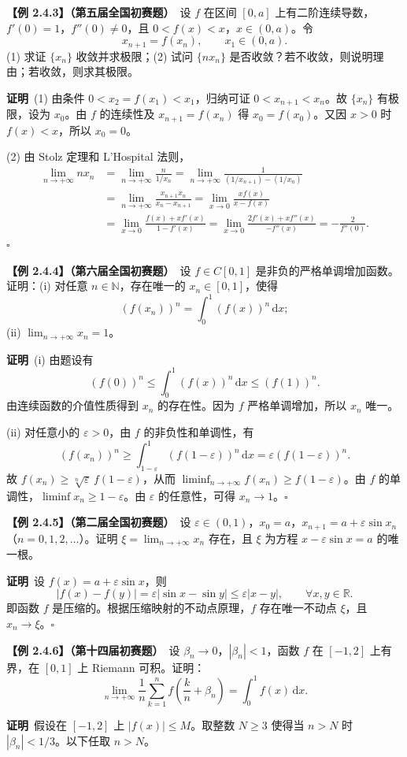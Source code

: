 \documentclass[UTF8,a4paper,11pt]{ctexart}
\newcommand{\ex}[2]{\par\medskip\noindent\textbf{【例 #1】（#2）}\ }
\newcommand{\pf}{\par\noindent\textbf{证明}\ }
\begin{document}
\ex{2.4.3}{第五届全国初赛题}设 $f$ 在区间 $[0,a]$ 上有二阶连续导数，$f'(0)=1$，$f''(0)\ne0$，且 $0<f(x)<x$，$x\in(0,a)$。令
\[
x_{n+1}=f(x_n),\qquad x_1\in(0,a).
\]
(1) 求证 $\{x_n\}$ 收敛并求极限；(2) 试问 $\{nx_n\}$ 是否收敛？若不收敛，则说明理由；若收敛，则求其极限。

\pf (1) 由条件 $0<x_2=f(x_1)<x_1$，归纳可证 $0<x_{n+1}<x_n$。故 $\{x_n\}$ 有极限，设为 $x_0$。由 $f$ 的连续性及 $x_{n+1}=f(x_n)$ 得 $x_0=f(x_0)$。又因 $x>0$ 时 $f(x)<x$，所以 $x_0=0$。

(2) 由 Stolz 定理和 L'Hospital 法则，
\begin{align*}
\lim_{n\to+\infty}nx_n
&=\lim_{n\to+\infty}\frac{n}{1/x_n}
=\lim_{n\to+\infty}\frac1{(1/x_{n+1})-(1/x_n)}\\
&=\lim_{n\to+\infty}\frac{x_{n+1}x_n}{x_n-x_{n+1}}
=\lim_{x\to0}\frac{x f(x)}{x-f(x)}\\
&=\lim_{x\to0}\frac{f(x)+xf'(x)}{1-f'(x)}
=\lim_{x\to0}\frac{2f'(x)+xf''(x)}{-f''(x)}
=-\frac2{f''(0)}.
\end{align*}
\hfill$\square$

\ex{2.4.4}{第六届全国初赛题}设 $f\in C[0,1]$ 是非负的严格单调增加函数。证明：(i) 对任意 $n\in\mathbb N$，存在唯一的 $x_n\in[0,1]$，使得
\[
(f(x_n))^n=\int_0^1(f(x))^n\,\mathrm dx;
\]
(ii) $\lim_{n\to+\infty}x_n=1$。

\pf (i) 由题设有
\[
(f(0))^n\le\int_0^1(f(x))^n\,\mathrm dx\le(f(1))^n.
\]
由连续函数的介值性质得到 $x_n$ 的存在性。因为 $f$ 严格单调增加，所以 $x_n$ 唯一。

(ii) 对任意小的 $\varepsilon>0$，由 $f$ 的非负性和单调性，有
\[
(f(x_n))^n\ge\int_{1-\varepsilon}^1(f(1-\varepsilon))^n\,\mathrm dx
=\varepsilon(f(1-\varepsilon))^n.
\]
故 $f(x_n)\ge\sqrt[n]{\varepsilon}\,f(1-\varepsilon)$，从而 $\liminf_{n\to+\infty}f(x_n)\ge f(1-\varepsilon)$。由 $f$ 的单调性，$\liminf x_n\ge1-\varepsilon$。由 $\varepsilon$ 的任意性，可得 $x_n\to1$。\hfill$\square$

\ex{2.4.5}{第二届全国初赛题}设 $\varepsilon\in(0,1)$，$x_0=a$，$x_{n+1}=a+\varepsilon\sin x_n$（$n=0,1,2,\ldots$）。证明 $\xi=\lim_{n\to+\infty}x_n$ 存在，且 $\xi$ 为方程 $x-\varepsilon\sin x=a$ 的唯一根。
\pf 设 $f(x)=a+\varepsilon\sin x$，则
\[
|f(x)-f(y)|=\varepsilon|\sin x-\sin y|\le\varepsilon|x-y|,\qquad \forall x,y\in\mathbb R.
\]
即函数 $f$ 是压缩的。根据压缩映射的不动点原理，$f$ 存在唯一不动点 $\xi$，且 $x_n\to\xi$。\hfill$\square$

\ex{2.4.6}{第十四届初赛题}设 $\beta_n\to0$，$|\beta_n|<1$，函数 $f$ 在 $[-1,2]$ 上有界，在 $[0,1]$ 上 Riemann 可积。证明：
\[
\lim_{n\to+\infty}\frac1n\sum_{k=1}^{n}f\!\left(\frac{k}{n}+\beta_n\right)=\int_0^1 f(x)\,\mathrm dx.
\]
\pf 假设在 $[-1,2]$ 上 $|f(x)|\le M$。取整数 $N\ge3$ 使得当 $n>N$ 时 $|\beta_n|<1/3$。以下任取 $n>N$。
\end{document}

